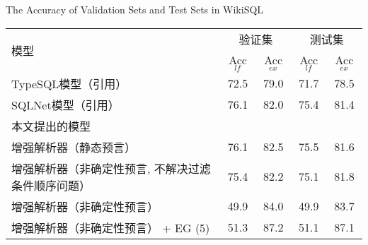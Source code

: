 \begin{table}[!htpb]
    {The Accuracy of Validation Sets and Test Sets in WikiSQL}
  \label{tab:wzyzjhcsjdzqd}
  \centering
  \begin{threeparttable}[b]
     \begin{tabular}{lcccc}
      \toprule
      \multirow{2}{10mm}{模型}&\multicolumn{2}{c}{验证集} & \multicolumn{2}{c}{测试集}\\
      \cmidrule(lr){2-3}\cmidrule(lr){4-5}
      & Acc$_{lf}$ & Acc$_{ex}$ & Acc$_{lf}$ & Acc$_{ex}$\\
      \midrule
      TypeSQL模型（引用） & 72.5 & 79.0 & 71.7 & 78.5\\
      SQLNet模型（引用） & 76.1 & 82.0 & 75.4 & 81.4\\
      \midrule 
      本文提出的模型 &  &  &  & \\
      增强解析器（静态预言） & 76.1 & 82.5 & 75.5 & 81.6\\
      增强解析器（非确定性预言, 不解决过滤条件顺序问题） & 75.4 & 82.2 & 75.1 & 81.8\\
      增强解析器（非确定性预言） & 49.9 & 84.0 & 49.9 & 83.7\\
      增强解析器（非确定性预言） + EG (5) & 51.3 & 87.2 & 51.1 & 87.1\\
      \bottomrule
    \end{tabular}
  \end{threeparttable}
\end{table}

